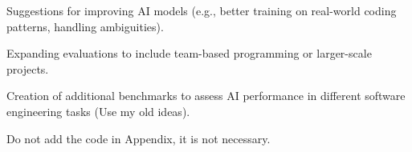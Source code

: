 Suggestions for improving AI models (e.g., better training on real-world coding patterns, handling ambiguities).

Expanding evaluations to include team-based programming or larger-scale projects.

Creation of additional benchmarks to assess AI performance in different software engineering tasks (Use my old ideas).



Do not add the code in Appendix, it is not necessary.